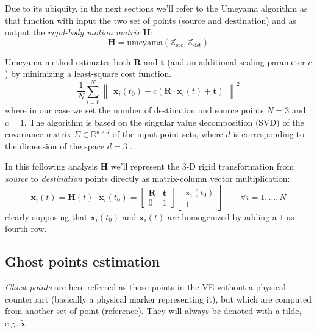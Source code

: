 \documentclass[acmtocl,acmnow]{acmtrans2m}
\begin{document}
Due to its ubiquity, in the next sections we'll refer to the Umeyama algorithm as that function with input the two set of points (source and destination) and as output the \emph{rigid-body motion matrix} $\mathbf{H}$:
\begin{equation}
 \mathbf{H} = \textrm{umeyama}\left( \mathbb{X}_{\textrm{src}}, \mathbb{X}_{\textrm{dst}} \right)
\end{equation}

Umeyama method estimates both $\mathbf{R}$ and $\mathbf{t}$ (and an
additional scaling parameter $c$) by minimizing a least-square cost function.
\begin{equation}\label{eq:umeyama}
 \dfrac{1}{N}  \sum \limits_{i=0}^N \begin{Vmatrix} \mathbf{x}_{i}(t_0)
-c(\mathbf{R} \cdot \mathbf{x}_i(t) +\mathbf{t}) \end{Vmatrix}^2
\end{equation}
where in our case we set the number of destination and source points $N=3$ and
$c=1$. The algorithm is based on the singular value
decomposition (SVD) of the covariance matrix $\Sigma \in
\mathbb{R}^{d \times d}$ of the input point sets, where $d$ is corresponding to the dimension of the space $d=3$ \cite{umeyama,DBLP:books/daglib/0086372,eigenweb}. 

In this following analysis $\mathbf{H}$ we'll represent the 3-D rigid transformation from \emph{source} to \emph{destination} points directly as matrix-column vector multiplication:
\begin{equation}
 \mathbf{x}_i(t) =  \mathbf{H}(t)\cdot \mathbf{x}_i(t_0) = \begin{bmatrix} \mathbf{R} & \mathbf{t} \\ 0 & 1\end{bmatrix} \begin{bmatrix} \mathbf{x}_i(t_0) \\ 1\end{bmatrix}\qquad \forall
i=1,\ldots,N
\end{equation}
clearly supposing that $\mathbf{x}_i(t_0)$ and $\mathbf{x}_i(t)$ are homogenized by adding a $1$ as fourth row.

\subsection{Ghost points estimation}

\emph{Ghost points} are here referred as those points in the VE without a
physical counterpart (basically a physical marker representing it), but which
are computed from another set of point (reference). They will always be denoted
 with a tilde, e.g. $\tilde{\mathbf{x}}$
\end{document}
